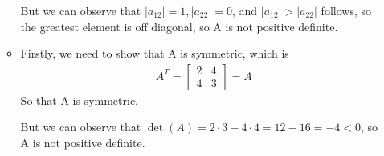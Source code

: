 \documentclass{article}
\begin{document}
\begin{enumerate}
\begin{itemize}
But we can observe that $|a_{12}| =1 , |a_{22}| =0$, and $|a_{12}| > |a_{22}|$ follows, so the greatest element is off diagonal, so A is not positive definite.
\item
Firstly, we need to show that A is symmetric, which is \begin{align*}
A^T = \begin{bmatrix}
2&4\\4&3
\end{bmatrix} =A
\end{align*}
So that A is symmetric.

But we can observe that $\det(A) = 2\cdot 3 - 4\cdot 4 = 12-16=-4 <0$, so A is not positive definite.
\iffalse
Second, we need to show that A is positive definite that \begin{align*}
x^TAx&=\begin{bmatrix}
x_1&x_2
\end{bmatrix}\begin{bmatrix}
2&4\\4&3
\end{bmatrix}\begin{bmatrix}
x_1\\x_2
\end{bmatrix}\\
&=\begin{bmatrix}
2x_1+4x_2&4x_1+3x_2
\end{bmatrix}\begin{bmatrix}
x_1\\x_2
\end{bmatrix}\\
&=2x_1^2+8x_1x_2+3x_2^2\\
&=2(x_1^2+4x_1x_2+\frac{3}{2}x_2^2)\\
&=2((x_1+2x_2)^2 - \frac{5}{2}x_2^2)
\end{align*}
Since when $x_1=1, x_2=4$, $x^TAx =2\cdot(25- \frac{5}{2}\cdot 4^2) = 2\cdot(-15) = -30$, so that A is not positive definite.
\fi
\end{itemize}


\end{enumerate}
\end{document}
